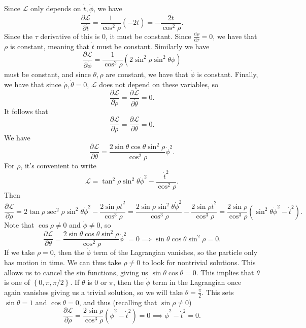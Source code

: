 \documentclass[11pt, letterpaper]{article}
\theoremstyle{plain}
\begin{document}
Since $\mathcal{L} $ only depends on $\dot{t} ,\dot{\phi } $, we have
\[
	\frac{\partial \mathcal{L} }{\partial \dot{t} } =\frac{1}{\cos ^2\rho } \left( -2 \dot{t} \right)=-\frac{2 \dot{t} }{\cos ^2\rho } 
.\]
Since the $\tau $ derivative of this is 0, it must be constant. Since $\frac{\mathrm{d}\rho }{\mathrm{d}\tau } =0$, we have that $\rho $ is constant, meaning that $\dot{t} $ must be constant. Similarly we have
\[
	\frac{\partial \mathcal{L} }{\partial \dot{\phi } } =\frac{1}{\cos ^2\rho } \left( 2 \sin ^2\rho \sin ^2\theta \dot{\phi }  \right) 
\]
must be constant, and since $\theta ,\rho $ are constant, we have that $\dot{\phi } $ is constant. Finally, we have that since $\dot{\rho } ,\dot{\theta } =0$, $\mathcal{L} $ does not depend on these variables, so
\[
	\frac{\partial \mathcal{L} }{\partial \dot{\rho } } =\frac{\partial \mathcal{L} }{\partial \dot{\theta } } =0
.\]
It follows that
\[
	\frac{\partial \mathcal{L} }{\partial \rho } =\frac{\partial \mathcal{L} }{\partial \theta } =0
.\]
We have
\[
	\frac{\partial \mathcal{L} }{\partial \theta } =\frac{2 \sin \theta \cos \theta \sin ^2\rho }{\cos ^2\rho } \dot{\phi } ^2
.\]
For $\rho $, it's convenient to write
\[
	\mathcal{L} =\tan ^2\rho \sin ^2\theta \dot{\phi } ^2-\frac{\dot{t} ^2}{\cos ^2\rho } 
.\]
Then
\[
	\frac{\partial \mathcal{L} }{\partial \rho } =2 \tan \rho \sec ^2 \rho \sin ^2\theta \dot{\phi } ^2-\frac{2\sin \rho \dot{t} ^2}{\cos ^3\rho } =\frac{2 \sin \rho \sin ^2\theta \dot{\phi } ^2 }{\cos ^3 \rho } -\frac{2\sin \rho \dot{t} ^2}{\cos ^3\rho } =\frac{2\sin \rho }{\cos ^3\rho } \left(  \sin ^2\theta \dot{\phi } ^2-\dot{t} ^2 \right) 
.\]
Note that $\cos \rho \neq 0$ and $\dot{\phi } \neq 0$, so
\[
	\frac{\partial \mathcal{L} }{\partial \theta } =\frac{2 \sin \theta \cos \theta \sin ^2\rho }{\cos ^2\rho } \dot{\phi } ^2=0 \implies \sin \theta \cos \theta \sin ^2\rho =0
.\]
If we take $\rho =0$, then the $\dot{\phi } $ term of the Lagrangian vanishes, so the particle only has motion in time. We can thus take $\rho \neq 0$ to look for nontrivial solutions. This allows us to cancel the sin functions, giving us $\sin \theta \cos \theta =0$. This implies that $\theta $ is one of $\left\{ 0,\pi ,\pi /2 \right\} $. If $\theta $ is $0$ or $\pi $, then the $\dot{\phi } $ term in the Lagrangian once again vanishes giving us a trivial solution, so we will take $\theta =\frac{\pi }{2} $. This sets $\sin \theta =1$ and $\cos \theta =0$, and thus (recalling that $\sin \rho \neq 0$)
\[
	\frac{\partial \mathcal{L} }{\partial \rho } =\frac{2 \sin \rho }{\cos ^3\rho } \left( \dot{\phi } ^2-\dot{t} ^2 \right) =0\implies  \dot{\phi } ^2-\dot{t} ^2=0
.\]
\end{document}
